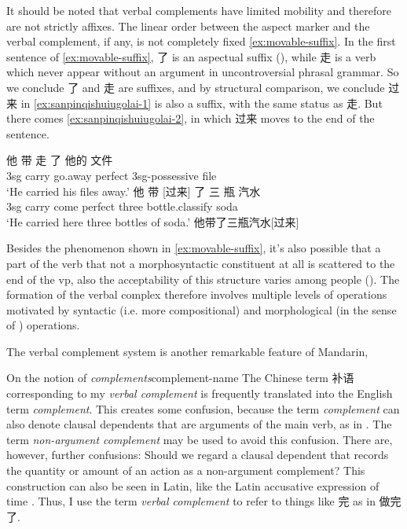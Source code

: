 \documentclass[UTF8, a4paper, oneside, scheme=plain]{ctexrep}
\newcommand*{\citesec}[1]{\S~{#1}}
\newcommand*{\term}[1]{\emph{#1}}
\newcommand{\translate}[1]{`#1'}
\begin{document}
It should be noted that 
verbal complements have limited mobility and therefore are not strictly affixes.
The linear order between the aspect marker and the verbal complement, if any, 
is not completely fixed \eqref{ex:movable-suffix}.
In the first sentence of \eqref{ex:movable-suffix}, 
了 is an aspectual suffix (),
while 走 is a verb which never appear without an argument in uncontroversial phrasal grammar.
So we conclude 了 and 走 are suffixes,
and by structural comparison, 
we conclude 过来 in \eqref{ex:sanpinqishuiugolai-1} 
is also a suffix, with the same status as 走.
But there comes \eqref{ex:sanpinqishuiugolai-2},
in which 过来 moves to the end of the sentence.

\begin{exe}
    \ex \begin{xlist}
        \ex \gll 他 带 走 了 他的 文件  \\ 
        3sg carry go.away \acs{perfect} 3sg-\acs{possessive} file \\
        \glt \translate{He carried his files away.}
        \ex \gll 他 带 [过来] 了 三 瓶 汽水 \\
        3sg carry come \acs{perfect} three bottle.\acs{classify} soda \\
        \glt \translate{He carried here three bottles of soda.} 
        \label{ex:sanpinqishuiugolai-1}
        \ex 他带了三瓶汽水[过来]
        \label{ex:sanpinqishuiugolai-2}
    \end{xlist}
    \label{ex:movable-suffix}
\end{exe}

Besides the phenomenon shown in \eqref{ex:movable-suffix},
it's also possible that
a part of the verb that not a morphosyntactic constituent at all 
is scattered to the end of the \acs{vp},
also the acceptability of this structure 
varies among people 
().
The formation of the verbal complex therefore involves 
multiple levels of operations 
motivated by syntactic (i.e. more compositional) 
and morphological (in the sense of ) operations.

The verbal complement system is another remarkable feature of Mandarin, 

\begin{infobox}{On the notion of \term{complements}}{complement-name}
    The Chinese term 补语 corresponding to my \term{verbal complement}
    is frequently translated into the English term \term{complement}.
    This creates some confusion,
    because the term \term{complement} can also denote 
    clausal dependents that are arguments of the main verb, as in \citet{cgel}.
    The term \term{non-argument complement} may be used to avoid this confusion.
    There are, however, further confusions:
    Should we regard a clausal dependent that records the quantity or amount of an action 
    as a non-argument complement?
    This construction can also be seen in Latin, 
    like the Latin accusative expression of time \citep[\citesec{423}]{greenough2013allen}.
    Thus, I use the term \term{verbal complement} to refer to 
    things like 完 as in 做完了.
\end{infobox}
\end{document}
